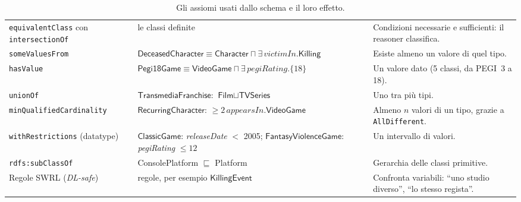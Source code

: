\documentclass[10pt,a4paper]{article}
\newcommand{\cls}[1]{\textsf{#1}}
\newcommand{\prop}[1]{\textit{#1}}
\begin{document}
\begin{table}[htbp]
\begin{tabularx}{\linewidth}{@{}p{2.7cm}p{3.7cm}Y@{}}
\texttt{equivalentClass} con \texttt{intersectionOf} & le \nDefinite{} classi definite & Condizioni necessarie e sufficienti: il reasoner classifica. \\
\texttt{someValuesFrom} & $\cls{DeceasedCharacter} \equiv \cls{Character} \sqcap \exists\,\prop{victimIn}.\cls{Killing}$ & Esiste almeno un valore di quel tipo. \\
\texttt{hasValue} & $\cls{Pegi18Game} \equiv \cls{VideoGame} \sqcap \exists\,\prop{pegiRating}.\{18\}$ & Un valore dato (5 classi, da PEGI~3 a 18). \\
\texttt{unionOf} & $\cls{TransmediaFranchise}$: $\cls{Film} \sqcup \cls{TVSeries}$ & Uno tra più tipi. \\
\texttt{minQualified}\allowbreak\texttt{Cardinality} & $\cls{RecurringCharacter}$: ${\geq}2\,\prop{appearsIn}.\cls{VideoGame}$ & Almeno $n$ valori di un tipo, grazie a \texttt{AllDifferent}. \\
\texttt{withRestrictions} (datatype) & $\cls{ClassicGame}$: \prop{releaseDate} $<$ 2005; $\cls{FantasyViolenceGame}$: \prop{pegiRating} $\leq 12$ & Un intervallo di valori. \\
\texttt{rdfs:subClassOf} & \cls{ConsolePlatform} $\sqsubseteq$ \cls{Platform} & Gerarchia delle classi primitive. \\
Regole SWRL (\textit{DL-safe}) & \nRegole{} regole, per esempio $\textsf{KillingEvent}$ & Confronta variabili: ``uno studio diverso'', ``lo stesso regista''. \\
\bottomrule
\end{tabularx}
\caption{Gli assiomi usati dallo schema e il loro effetto.}\label{tab:assiomi}
\end{table}
\end{document}
